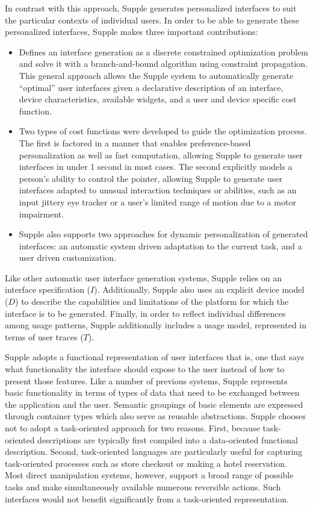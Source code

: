 In contrast with this approach, Supple generates personalized interfaces to suit the particular contexts of individual users. In order to be able to generate these personalized interfaces, Supple makes three important contributions:
\begin{itemize}
\item Defines an interface generation as a discrete constrained optimization problem and solve it with a branch-and-bound algorithm using constraint propagation. This general approach allows the Supple system to automatically generate ``optimal'' user interfaces given a declarative description of an interface, device characteristics, available widgets, and a user and device specific cost function.

\item Two types of cost functions were developed to guide the optimization process. The first is factored in a manner that enables preference-based personalization as well as fast computation, allowing Supple to generate user interfaces in under 1 second in most cases. The second explicitly models a person's ability to control the pointer, allowing Supple to generate user interfaces adapted to unusual interaction techniques or abilities, such as an input jittery eye tracker or a user's limited range of motion due to a motor impairment.

\item Supple also supports two approaches for dynamic personalization of generated interfaces: an automatic system driven adaptation to the current task, and a user driven customization.
\end{itemize}

Like other automatic user interface generation systems, Supple relies on an interface specification ($I$). Additionally, Supple also uses an explicit device model ($D$) to describe the capabilities and limitations of the platform for which the interface is to be generated. Finally, in order to reflect individual differences among usage patterns, Supple additionally includes a usage model, represented in terms of user traces ($T$).

Supple adopts a functional representation of user interfaces that is, one that says what functionality the interface should expose to the user instead of how to present those features. Like a number of previous systems, Supple represents basic functionality in terms of types of data that need to be exchanged between the application and the user. Semantic groupings of basic elements are expressed through container types which also serve as reusable abstractions. Supple chooses not to adopt a task-oriented approach for two reasons. First, because task-oriented descriptions are typically first compiled into a data-oriented functional description. Second, task-oriented languages are particularly useful for capturing task-oriented processes such as store checkout or making a hotel reservation. Most direct manipulation systems, however, support a broad range of possible tasks and make simultaneously available numerous reversible actions. Such interfaces would not benefit significantly from a task-oriented representation.

